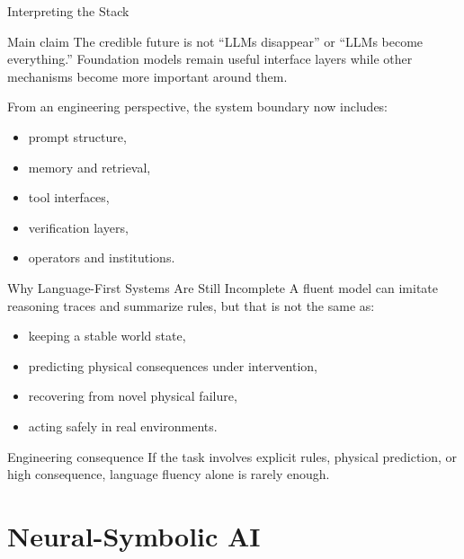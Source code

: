 \documentclass[12pt]{beamer}
\begin{document}
\begin{frame}{Interpreting the Stack}
  \begin{conceptbox}{Main claim}
    The credible future is not ``LLMs disappear'' or ``LLMs become everything.'' Foundation models remain useful interface layers while other mechanisms become more important around them.
  \end{conceptbox}

  From an engineering perspective, the system boundary now includes:
  \begin{itemize}
    \item prompt structure,
    \item memory and retrieval,
    \item tool interfaces,
    \item verification layers,
    \item operators and institutions.
  \end{itemize}
\end{frame}

\begin{frame}{Why Language-First Systems Are Still Incomplete}
  A fluent model can imitate reasoning traces and summarize rules, but that is not the same as:
  \begin{itemize}
    \item keeping a stable world state,
    \item predicting physical consequences under intervention,
    \item recovering from novel physical failure,
    \item acting safely in real environments.
  \end{itemize}

  \begin{warningbox}{Engineering consequence}
    If the task involves explicit rules, physical prediction, or high consequence, language fluency alone is rarely enough.
  \end{warningbox}
\end{frame}

\section{Neural-Symbolic AI}
\end{document}
